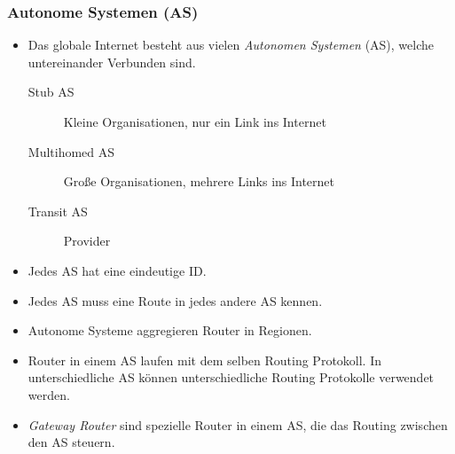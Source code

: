             \subsubsection{Autonome Systemen (AS)}
                \begin{itemize}
                	\item Das globale Internet besteht aus vielen \textit{Autonomen Systemen} (AS), welche untereinander Verbunden sind.
                    	\begin{description}
                    		\item[Stub AS] Kleine Organisationen, nur ein Link ins Internet
                    		\item[Multihomed AS] Große Organisationen, mehrere Links ins Internet
                    		\item[Transit AS] Provider
                    	\end{description}
                    \item Jedes AS hat eine eindeutige ID.
                    \item Jedes AS muss eine Route in jedes andere AS kennen.
                    \item Autonome Systeme aggregieren Router in Regionen.
                    \item Router in einem AS laufen mit dem selben Routing Protokoll. In unterschiedliche AS können unterschiedliche Routing Protokolle verwendet werden.
                    \item \textit{Gateway Router} sind spezielle Router in einem AS, die das Routing zwischen den AS steuern.
                \end{itemize}

